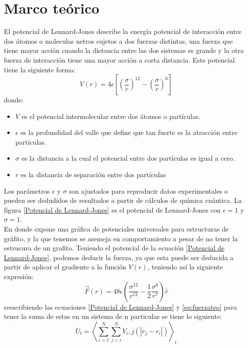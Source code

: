 \section{Marco teórico}
El potencial de Lennard-Jones describe la energía potencial de interacción entre dos átomos o moleculas netros sujetos a dos fuerzas distintas, una fuerza que tiene mayor acción cuando la distancia entre las dos sistemas es grande y la otra fuerza de interacción tiene una mayor acción a corta distancia. Este potencial tiene la siguiente forma:
\begin{equation}
    \label{Potencial de Lennard-Jones}
    V(r) = 4 \epsilon \left[\left(\frac{\sigma}{r} \right)^{12} - \left(\frac{\sigma}{r} \right)^6 \right]
\end{equation}
donde:
\begin{itemize}
    \item $V$ es el potencial intermolecular entre dos átomos o partículas.
    \item $\epsilon$ es la profundidad del valle que define que tan fuerte es la atracción entre partículas.
    \item $\sigma$ es la distancia a la cual el potencial entre dos partículas es igual a cero.
    \item $r$ es la distancia de separación entre dos partículas
\end{itemize}
Los parámetros $\epsilon$ y $\sigma$ son ajustados para reproducir datos experimentales o pueden ser dedudidos de resultados a partir de cálculos de química cuántica. La fígura \ref{Potencial de Lennard-Jones} es el potencial de Lennard-Jones con $\epsilon=1$ y $\sigma=1$.\\
En donde expone una gráfica de potenciales universales para estructuras de gráfito, y la que tenemos se asemeja en comportamiento a pesar de no tener la estrucura de un grafito.
Teniendo el potencial de la ecuación \ref{Potencial de Lennard-Jones}, podemos deducir la fuerza, ya que esta puede ser deducida a partir de aplicar el gradiente a la función $V(r)$, teniendo así la siguiente expresión:
\begin{equation}
    \label{eq:fuerzateo}
    \vec{F}(r)= 48\epsilon \left(\frac{\sigma^{12}}{r^{13}}- \frac{1}{2}\frac{\sigma^6}{r^7} \right) \hat{r}
\end{equation}
reescribiendo las ecuaciones \ref{Potencial de Lennard-Jones} y \ref{eq:fuerzateo} para tener la suma de estas en un sistema de n particulas se tiene lo siguiente:
\begin{equation}
    \label{eq:pot-n}
    U_t=\left\langle\sum_{i=1}^N \sum_{j<i}^N V_i,j(|r_j-r_i|)\right\rangle_t
\end{equation}
